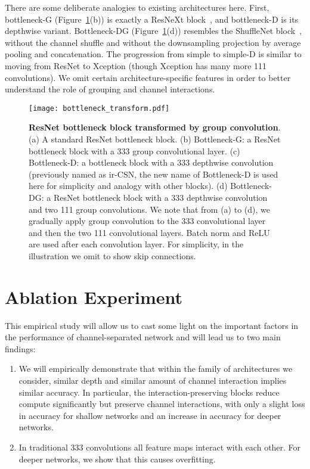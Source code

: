 \documentclass[10pt,twocolumn,letterpaper]{article}
\newcommand{\ddd}[1]{#1#1#1}
\begin{document}
There are some deliberate analogies to existing architectures here.  First, bottleneck-G (Figure~\ref{fig:bottleneck_transform}(b)) is exactly a ResNeXt block~\cite{SainingXie17}, and bottleneck-D is its depthwise variant. Bottleneck-DG (Figure~\ref{fig:bottleneck_transform}(d)) resembles the ShuffleNet block~\cite{ShuffleNet}, without the channel shuffle and without the downsampling projection by average pooling and concatenation. The progression from simple to simple-D is similar to moving from ResNet to Xception (though Xception has many more \ddd{1} convolutions).  We omit certain architecture-specific features in order to better understand the role of grouping and channel interactions.

\begin{figure}
\begin{center}
   \texttt{[image: bottleneck\_transform.pdf]}
\end{center}
\vspace{-10pt}
   \caption{{\bf ResNet bottleneck block transformed by group convolution}. (a) A standard ResNet bottleneck block. (b) Bottleneck-G: a ResNet bottleneck block with a \ddd{3} group convolutional layer. (c) Bottleneck-D: a bottleneck block with a \ddd{3} depthwise convolution (previously named as ir-CSN, the new name of Bottleneck-D is used here for simplicity and analogy with other blocks). (d) Bottleneck-DG: a ResNet bottleneck block with a \ddd{3} depthwise convolution and two \ddd{1} group convolutions. We note that from (a) to (d), we gradually apply group convolution to the \ddd{3} convolutional layer and then the two \ddd{1} convolutional layers. Batch norm and ReLU are used after each convolution layer. For simplicity, in the illustration we omit to show skip connections.}
\label{fig:bottleneck_transform}
\end{figure}
 
\section{Ablation Experiment}
\label{sec:experiments}

This empirical study will allow us to cast some light on the important factors in the performance of channel-separated network and will lead us to two main findings:
\begin{enumerate}
\item We will empirically demonstrate that within the family of architectures we consider, similar depth and similar amount of channel interaction implies similar accuracy.  In particular, the interaction-preserving blocks reduce compute significantly but preserve channel interactions, with only a slight loss in accuracy for shallow networks and an increase in accuracy for deeper networks.
\item In traditional \ddd{3} convolutions all feature maps interact with each other. For deeper networks, we show that this causes overfitting.
\end{enumerate}
\end{document}
